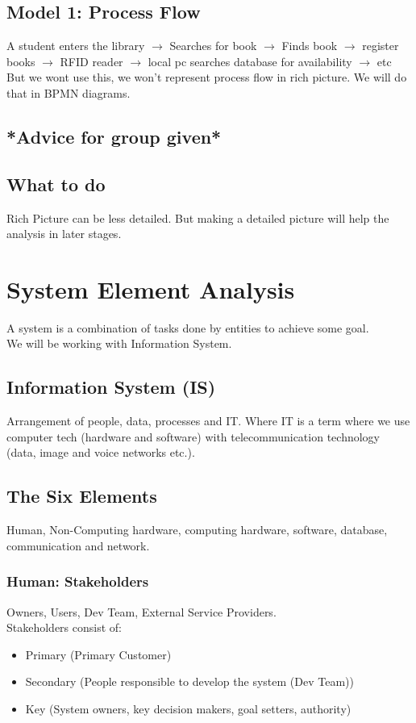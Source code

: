 \documentclass{article}
\begin{document}
        \subsection*{Model 1: Process Flow}
            A student enters the library \(\rightarrow\) Searches for book \(\rightarrow\) Finds book \(\to\) register books \(\to\) RFID reader \(\to\) local pc searches database for availability \(\to\) etc
            \\
            But we wont use this, we won't represent process flow in rich picture. We will do that in BPMN diagrams.
        \subsection*{*Advice for group given*}
        \subsection*{What to do}
            Rich Picture can be less detailed. But making a detailed picture will help the analysis in later stages.
    \section*{System Element Analysis}
        A system is a combination of tasks done by entities to achieve some goal.\\
        We will be working with Information System.
        \subsection*{Information System (IS)}
            Arrangement of people, data, processes and IT. Where IT is a term where we use computer tech (hardware and software) with telecommunication technology (data, image and voice networks etc.).
        \subsection*{The Six Elements}
            Human, Non-Computing hardware, computing hardware, software, database, communication and network.
            \subsubsection*{Human: Stakeholders}
                Owners, Users, Dev Team, External Service Providers.\\
                Stakeholders consist of:
                \begin{itemize}
                    \item Primary (Primary Customer)
                    \item Secondary (People responsible to develop the system (Dev Team))
                    \item Key (System owners, key decision makers, goal setters, authority)
                \end{itemize}
\end{document}
